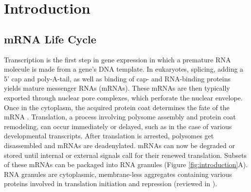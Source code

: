 \chapter{Introduction}


\section{mRNA Life Cycle}

Transcription is the first step in gene expression in which a premature RNA
    molecule is made from a gene's DNA template.
In eukaryotes, splicing, adding a 5' cap and poly-A-tail, as well as binding of cap-
    and RNA-binding proteins yields mature messenger RNAs (mRNAs).
These mRNAs are then typically exported through nuclear pore complexes, which perforate the
    nuclear envelope.
Once in the cytoplasm, the acquired protein coat determines the fate of the mRNA \cite{moore_birth_2005}.
Translation, a process involving polysome assembly and protein coat remodeling,
    can occur immediately or delayed, such as in the case of various developmental
    transcripts.
After translation is arrested, polysomes get disassembled and mRNAs are deadenylated.
    mRNAs can now be degraded or stored until internal or external signals call for
    their renewed translation.
Subsets of these mRNAs can be packaged into RNA granules (Figure \ref{fig:introduction}A).
RNA granules are cytoplasmic, membrane-less aggregates containing 
    various proteins involved in translation initiation and repression (reviewed in \cite{anderson_rna_2006}).

